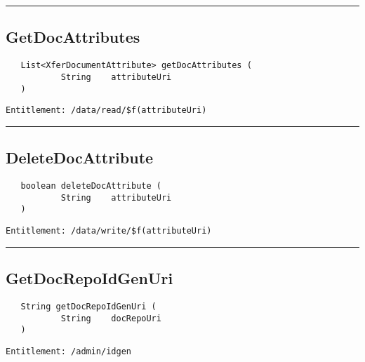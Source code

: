 \rule{12cm}{2pt}
\subsection{GetDocAttributes}
\label{Api:GetDocAttributes}
\begin{verbatim}
   List<XferDocumentAttribute> getDocAttributes (
           String    attributeUri
   )
\end{verbatim}
\begin{Verbatim}[fontsize=\small, formatcom=\color{Maroon}]
  Entitlement: /data/read/$f(attributeUri)
\end{Verbatim}



\rule{12cm}{2pt}
\subsection{DeleteDocAttribute}
\label{Api:DeleteDocAttribute}
\begin{verbatim}
   boolean deleteDocAttribute (
           String    attributeUri
   )
\end{verbatim}
\begin{Verbatim}[fontsize=\small, formatcom=\color{Maroon}]
  Entitlement: /data/write/$f(attributeUri)
\end{Verbatim}



\rule{12cm}{2pt}
\subsection{GetDocRepoIdGenUri}
\label{Api:GetDocRepoIdGenUri}
\begin{verbatim}
   String getDocRepoIdGenUri (
           String    docRepoUri
   )
\end{verbatim}
\begin{Verbatim}[fontsize=\small, formatcom=\color{Maroon}]
  Entitlement: /admin/idgen
\end{Verbatim}




